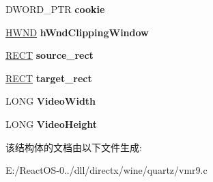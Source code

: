 \begin{DoxyCompactItemize}
\item 
\mbox{\label{structquartz__vmr_aea633ad1d43bf102fde22d9cf1e90724}} 
D\+W\+O\+R\+D\+\_\+\+P\+TR {\bfseries cookie}
\item 
\mbox{\label{structquartz__vmr_ab57b9d14d4d101927dec88f15a5aee80}} 
\hyperlink{interfacevoid}{H\+W\+ND} {\bfseries h\+Wnd\+Clipping\+Window}
\item 
\mbox{\label{structquartz__vmr_acd88f754e5837dc763bd6a710a9bf196}} 
\hyperlink{structtag_r_e_c_t}{R\+E\+CT} {\bfseries source\+\_\+rect}
\item 
\mbox{\label{structquartz__vmr_a7ec6f44671eb8400e72929aa1c86b0f5}} 
\hyperlink{structtag_r_e_c_t}{R\+E\+CT} {\bfseries target\+\_\+rect}
\item 
\mbox{\label{structquartz__vmr_ad43a1ce28bcd70f096620d4b3368f456}} 
L\+O\+NG {\bfseries Video\+Width}
\item 
\mbox{\label{structquartz__vmr_a326155e14f2e7f7e9eec11d91ebec9ac}} 
L\+O\+NG {\bfseries Video\+Height}
\end{DoxyCompactItemize}


该结构体的文档由以下文件生成\+:\begin{DoxyCompactItemize}
\item 
E\+:/\+React\+O\+S-\/0../dll/directx/wine/quartz/vmr9.\+c\end{DoxyCompactItemize}
